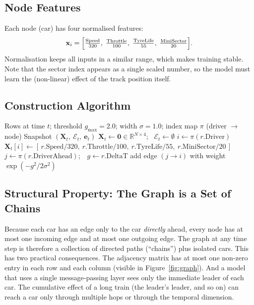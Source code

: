\documentclass[11pt,a4paper]{article}
\begin{document}
\subsection{Node Features}
Each node (car) has four normalised features:
\begin{equation}
\mathbf{x}_i = \Bigl[\tfrac{\text{Speed}}{320},\; \tfrac{\text{Throttle}}{100},\;
\tfrac{\text{TyreLife}}{55},\; \tfrac{\text{MiniSector}}{20}\Bigr].
\end{equation}
Normalisation keeps all inputs in a similar range, which makes training stable.
Note that the sector index appears as a single scaled number, so the model
must learn the (non-linear) effect of the track position itself.

\subsection{Construction Algorithm}
\begin{algorithm}[H]
\caption{Build the graph snapshot at time $t$}
\label{alg:graph}
\begin{algorithmic}[1]
\Require Rows at time $t$; threshold $g_{\max}=2.0$; width $\sigma=1.0$; index map $\pi$ (driver $\to$ node)
\Ensure Snapshot $(\mathbf{X}_t,\ \mathcal{E}_t,\ \mathbf{e}_t)$
\State $\mathbf{X}_t \gets \mathbf{0} \in \mathbb{R}^{N\times 4}$; \ $\mathcal{E}_t \gets \emptyset$
  \State $i \gets \pi(r.\text{Driver})$
  \State $\mathbf{X}_t[i] \gets [\,r.\text{Speed}/320,\ r.\text{Throttle}/100,\ r.\text{TyreLife}/55,\ r.\text{MiniSector}/20\,]$
  \State $j \gets \pi(r.\text{DriverAhead})$;\ \ $g \gets r.\text{DeltaT}$
    \State add edge $(j \to i)$ with weight $\exp(-g^2/2\sigma^2)$
  \EndIf
\EndFor
\end{algorithmic}
\end{algorithm}

\subsection{Structural Property: The Graph is a Set of Chains}
Because each car has an edge only to the car \emph{directly} ahead, every node
has at most one incoming edge and at most one outgoing edge. The graph at any
time step is therefore a collection of directed paths (``chains'') plus
isolated cars. This has two practical consequences. The adjacency matrix has
at most one non-zero entry in each row and each column (visible in
Figure~\ref{fig:graph}). And a model that uses a single message-passing layer
sees only the immediate leader of each car. The cumulative effect of a long
train (the leader's leader, and so on) can reach a car only through multiple
hops or through the temporal dimension.
\end{document}
